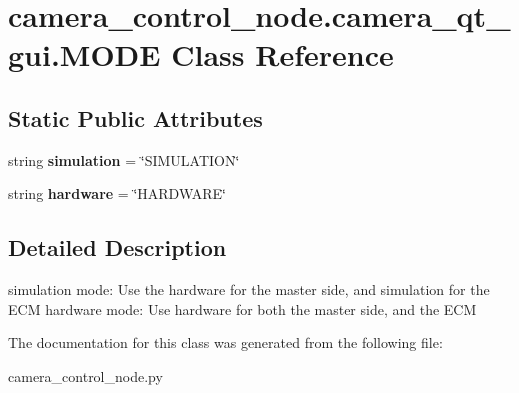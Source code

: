 \hypertarget{classcamera__control__node_1_1camera__qt__gui_1_1MODE}{\section{camera\-\_\-control\-\_\-node.\-camera\-\_\-qt\-\_\-gui.\-M\-O\-D\-E Class Reference}
\label{classcamera__control__node_1_1camera__qt__gui_1_1MODE}
}
\subsection*{Static Public Attributes}
\begin{DoxyCompactItemize}
\item 
\hypertarget{classcamera__control__node_1_1camera__qt__gui_1_1MODE_a30199ef49a0806add2c7fefc9938da16}{string {\bfseries simulation} = \char`\"{}S\-I\-M\-U\-L\-A\-T\-I\-O\-N\char`\"{}}\label{classcamera__control__node_1_1camera__qt__gui_1_1MODE_a30199ef49a0806add2c7fefc9938da16}

\item 
\hypertarget{classcamera__control__node_1_1camera__qt__gui_1_1MODE_a859ed9b0069803cf4378fd37f8bc56f9}{string {\bfseries hardware} = \char`\"{}H\-A\-R\-D\-W\-A\-R\-E\char`\"{}}\label{classcamera__control__node_1_1camera__qt__gui_1_1MODE_a859ed9b0069803cf4378fd37f8bc56f9}

\end{DoxyCompactItemize}


\subsection{Detailed Description}
\begin{DoxyVerb}    simulation mode: Use the hardware for the master side, 
            and simulation for the ECM
    hardware mode: Use hardware for both the master side,
            and the ECM
\end{DoxyVerb}
 

The documentation for this class was generated from the following file\-:\begin{DoxyCompactItemize}
\item 
camera\-\_\-control\-\_\-node.\-py\end{DoxyCompactItemize}
